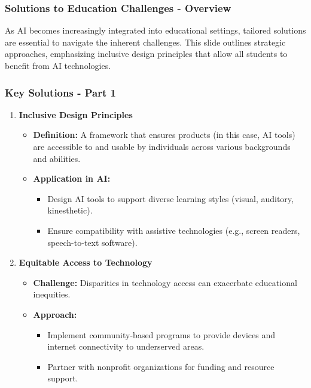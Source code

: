 \documentclass[aspectratio=169]{beamer}
\begin{document}
\begin{frame}[fragile]
    \frametitle{Solutions to Education Challenges - Overview}
    As AI becomes increasingly integrated into educational settings, tailored solutions are essential to navigate the inherent challenges. 
    This slide outlines strategic approaches, emphasizing inclusive design principles that allow all students to benefit from AI technologies.
\end{frame}

\begin{frame}[fragile]
    \frametitle{Key Solutions - Part 1}
    \begin{enumerate}
        \item \textbf{Inclusive Design Principles}
            \begin{itemize}
                \item \textbf{Definition:} A framework that ensures products (in this case, AI tools) are accessible to and usable by individuals across various backgrounds and abilities.
                \item \textbf{Application in AI:}
                    \begin{itemize}
                        \item Design AI tools to support diverse learning styles (visual, auditory, kinesthetic).
                        \item Ensure compatibility with assistive technologies (e.g., screen readers, speech-to-text software).
                    \end{itemize}
            \end{itemize}
        \item \textbf{Equitable Access to Technology}
            \begin{itemize}
                \item \textbf{Challenge:} Disparities in technology access can exacerbate educational inequities.
                \item \textbf{Approach:} 
                    \begin{itemize}
                        \item Implement community-based programs to provide devices and internet connectivity to underserved areas.
                        \item Partner with nonprofit organizations for funding and resource support.
                    \end{itemize}
            \end{itemize}
    \end{enumerate}
\end{frame}
\end{document}
